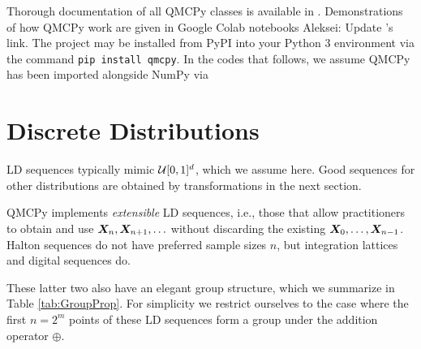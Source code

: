 \documentclass[graybox,footinfo]{svmult}
\newcommand{\AGSComment}[1]{{\color{cyan} Aleksei: #1}}
\begin{document}
Thorough documentation of all QMCPy classes is available in \cite{QMCPyDocs}. Demonstrations of how QMCPy work are given in Google Colab notebooks \cite{QMCPyTutColab2020,QMCPyTutColab2020_paper} \AGSComment{Update \cite{QMCPyTutColab2020_paper}'s link}. The project may be installed from PyPI into your Python 3 environment via the command \texttt{pip install qmcpy}. In the codes that follows, we assume QMCPy has been imported alongside NumPy \cite{numpy} 
via


\section{Discrete Distributions}

LD sequences typically mimic ${\mathcal{U}}[0,1]^d$, which we assume here.  Good sequences for other distributions are obtained by transformations in the next section.  

QMCPy implements \emph{extensible} LD sequences, i.e., those that allow practitioners to obtain and use ${\boldsymbol{X}}_n, {\boldsymbol{X}}_{n+1}, \ldots $ without discarding the existing ${\boldsymbol{X}}_0, \ldots, {\boldsymbol{X}}_{n-1}$.  Halton sequences do not have preferred sample sizes $n$, but integration lattices and digital sequences do.  

These latter two also have an elegant group structure, which we summarize in Table \ref{tab:GroupProp}.  For simplicity we restrict ourselves to the case where the first $n = 2^m$ points of these LD sequences form a group under the addition operator $\oplus$.
\end{document}
